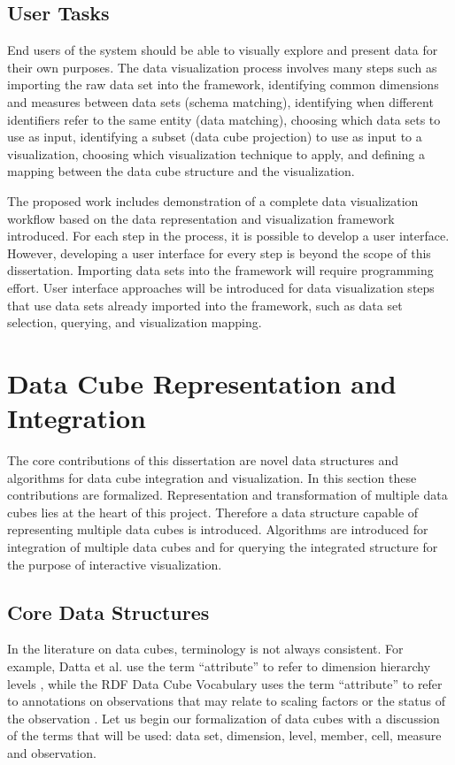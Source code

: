\documentclass[12pt]{article}
\begin{document}
\begin{doublespace}
\subsection{User Tasks}
End users of the system should be able to visually explore and present data for their own purposes. The data visualization process involves many steps such as importing the raw data set into the framework, identifying common dimensions and measures between data sets (schema matching), identifying when different identifiers refer to the same entity (data matching), choosing which data sets to use as input, identifying a subset (data cube projection) to use as input to a visualization, choosing which visualization technique to apply, and defining a mapping between the data cube structure and the visualization.

The proposed work includes demonstration of a complete data visualization workflow based on the data representation and visualization framework introduced. For each step in the process, it is possible to develop a user interface. However, developing a user interface for every step is beyond the scope of this dissertation. Importing data sets into the framework will require programming effort. User interface approaches will be introduced for data visualization steps that use data sets already imported into the framework, such as data set selection, querying, and visualization mapping.

\pagebreak
\section{Data Cube Representation and Integration}
The core contributions of this dissertation are novel data structures and algorithms for data cube integration and visualization. In this section these contributions are formalized. Representation and transformation of multiple data cubes lies at the heart of this project. Therefore a data structure capable of representing multiple data cubes is introduced. Algorithms are introduced for integration of multiple data cubes and for querying the integrated structure for the purpose of interactive visualization.
\subsection{Core Data Structures}
In the literature on data cubes, terminology is not always consistent. For example, Datta et al. use the term ``attribute'' to refer to dimension hierarchy levels \cite{datta1999cube}, while the RDF Data Cube Vocabulary uses the term ``attribute'' to refer to annotations on observations that may relate to scaling factors or the status of the observation \cite{rdfdatacube}. Let us begin our formalization of data cubes with a discussion of the terms that will be used: data set, dimension, level, member, cell, measure and observation.


\end{doublespace}
\end{document}
